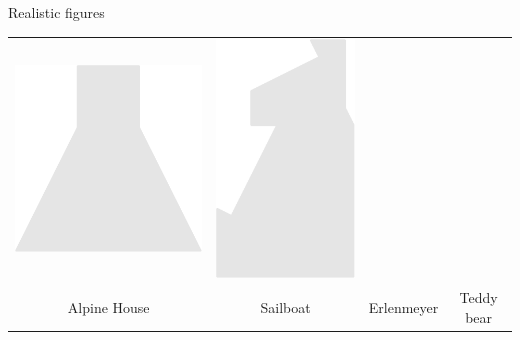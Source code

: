 \documentclass[14pt]{beamer}
\begin{document}
\begin{frame}{Realistic figures}
\begin{center}
{\begin{tabular}{cccc}
                \includegraphics[scale=0.25]{figures/figure026g.pdf} &
                \includegraphics[scale=0.25]{figures/figure026h.pdf}\\
                Alpine House & Sailboat & Erlenmeyer & Teddy bear\\[4ex]
            \end{tabular}
            
}
\end{center}
\end{frame}
\end{document}
